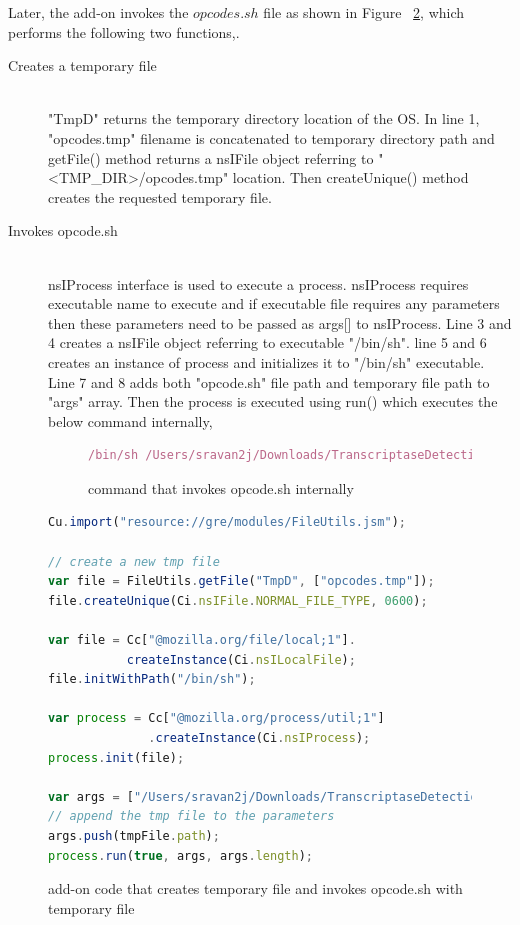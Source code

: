 Later, the add-on invokes the $opcodes.sh$ file as shown in Figure ~\ref{fig:invokeopcode}, which performs the following two functions,.
\begin{description}
\item[Creates a temporary file] \hfill \\
"TmpD" returns the temporary directory location of the OS. In line 1, "opcodes.tmp" filename is concatenated to temporary directory path and getFile() method returns a nsIFile object referring to "<TMP\_DIR>/opcodes.tmp" location. Then createUnique() method creates the requested temporary file.
\item[Invokes opcode.sh] \hfill \\
nsIProcess interface is used to execute a process. nsIProcess requires executable name to execute and if executable file requires any parameters then these parameters need to be passed as args[] to nsIProcess. Line 3 and 4 creates a nsIFile object referring to executable "/bin/sh". line 5 and 6 creates an instance of process and initializes it to "/bin/sh" executable. Line 7 and 8 adds both "opcode.sh" file path and temporary file path to "args" array. Then the process is executed using run() which executes the below command internally,
\begin{figure}[h]
  \centering
\begin{lstlisting}[frame=single,language=JavaScript,mathescape=false,numbers=none]
/bin/sh /Users/sravan2j/Downloads/TranscriptaseDetectionAddon/data/opcode.sh /tmp/opcodes.tmp
\end{lstlisting}
\caption[command that invokes opcode.sh internally]{command that invokes opcode.sh internally}
    \label{fig:invokeopcodeint}
\end{figure}

\end{description}

\begin{figure}[h]
  \centering
\begin{lstlisting}[frame=single,language=JavaScript,mathescape=false]
Cu.import("resource://gre/modules/FileUtils.jsm");

// create a new tmp file
var file = FileUtils.getFile("TmpD", ["opcodes.tmp"]);
file.createUnique(Ci.nsIFile.NORMAL_FILE_TYPE, 0600);

var file = Cc["@mozilla.org/file/local;1"].
           createInstance(Ci.nsILocalFile);
file.initWithPath("/bin/sh");

var process = Cc["@mozilla.org/process/util;1"]
              .createInstance(Ci.nsIProcess);
process.init(file);

var args = ["/Users/sravan2j/Downloads/TranscriptaseDetectionAddon/data/opcode.sh"];
// append the tmp file to the parameters
args.push(tmpFile.path);
process.run(true, args, args.length);
\end{lstlisting}
\caption[add-on code to invoke opcode.sh]{add-on code that creates temporary file and invokes opcode.sh with temporary file}
    \label{fig:invokeopcode}
\end{figure}

